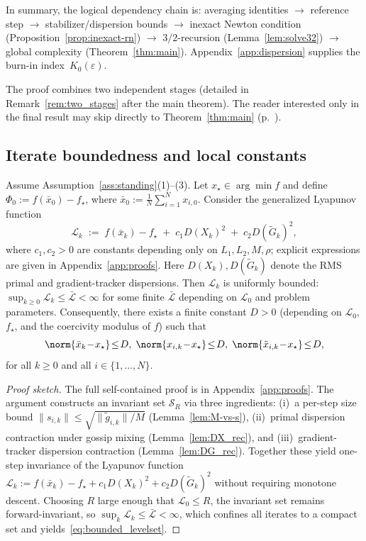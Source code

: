 \documentclass[review,onefignum,onetabnum]{siamart171218}
\begin{document}
	In summary, the logical dependency chain is:
	averaging identities $\to$ reference step $\to$ stabilizer/dispersion bounds
	$\to$ inexact Newton condition (Proposition~\ref{prop:inexact-rn})
	$\to$ $3/2$-recursion (Lemma~\ref{lem:solve32})
	$\to$ global complexity (Theorem~\ref{thm:main}).
	Appendix~\ref{app:dispersion} supplies the burn-in index~$K_0(\varepsilon)$.
	
	The proof combines two independent stages (detailed in
	Remark~\ref{rem:two_stages} after the main theorem).
	The reader interested only in the final result may skip directly to
	Theorem~\ref{thm:main} (p.~\pageref{thm:main}).
	
	\subsection{Iterate boundedness and local constants}\label{ssec:iterate_bound}
	
	\begin{lemma}\label{lem:lyap_bound}
		Assume Assumption~\ref{ass:standing}(1)--(3).
		Let $x_\star\in\arg\min f$ and define
		$\Phi_0:=f(\bar x_0)-f_\star$, where $\bar x_0:=\frac1N\sum_{i=1}^N x_{i,0}$.
		Consider the generalized Lyapunov function
		\[
		\mathcal L_k \;:=\; f(\bar x_k)-f_\star \;+\; c_1 D(X_k)^2 \;+\; c_2 D(\tilde G_k)^2,
		\]
		where $c_1,c_2>0$ are constants depending only on $L_1,L_2,M,\rho$;
		explicit expressions are given in Appendix~\ref{app:proofs}. Here
		$D(X_k), D(\tilde G_k)$ denote the RMS primal and gradient-tracker dispersions.
		Then $\mathcal L_k$ is uniformly bounded: $\sup_{k\ge 0}\mathcal L_k \le \bar{\mathcal L} < \infty$ for some finite $\bar{\mathcal L}$ depending on $\mathcal L_0$ and problem parameters.
		Consequently, there exists a finite constant $D>0$
		(depending on $\mathcal L_0$, $f_\star$, and the coercivity modulus of $f$)
		such that
		\begin{equation}\label{eq:bounded_levelset}
			\norm{\bar x_k\!-\!x_\star}\!\le\! D,\;
			\norm{x_{i,k}\!-\!x_\star}\!\le\! D,\;
			\norm{\tilde x_{i,k}\!-\!x_\star}\!\le\! D,
		\end{equation}
		for all $k\ge 0$ and all $i\in\{1,\dots,N\}$.
	\end{lemma}
	
	\begin{proof}[Proof sketch]
		The full self-contained proof is in Appendix~\ref{app:proofs}.
		The argument constructs an invariant set
		$\mathcal S_R$ via three ingredients:
		(i)~a per-step size bound $\|s_{i,k}\|\le\sqrt{\|\tilde g_{i,k}\|/M}$
		(Lemma~\ref{lem:M-vs-s}),
		(ii)~primal dispersion contraction under gossip mixing
		(Lemma~\ref{lem:DX_rec}), and
		(iii)~gradient-tracker dispersion contraction
		(Lemma~\ref{lem:DG_rec}).
		Together these yield one-step invariance of the Lyapunov function
		$\mathcal L_k:=f(\bar x_k)-f_\star+c_1 D(X_k)^2+c_2 D(\tilde G_k)^2$
		without requiring monotone descent.
		Choosing $R$ large enough that $\mathcal L_0\le R$, the
		invariant set remains forward-invariant, so
		$\sup_k\mathcal L_k\le\bar{\mathcal L}<\infty$,
		which confines all iterates to a compact set and
		yields~\eqref{eq:bounded_levelset}.
	\end{proof}
	
\end{document}
